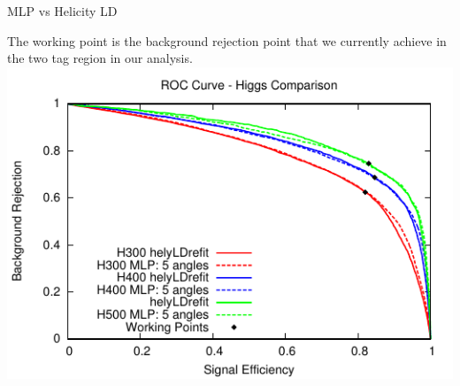 
\begin{frame}{MLP vs Helicity LD}
\begin{center}
The working point is the background rejection point that we currently achieve in the two tag region in our analysis.
\includegraphics[width=0.7\linewidth]{images/plots/NN/pretag_ROC_wincut.pdf}
\end{center}
\end{frame}









